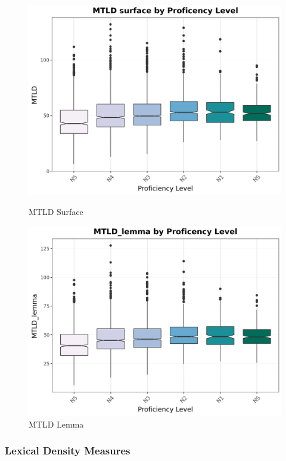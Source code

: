\begin{figure}[htbp]
    \centering
    \begin{minipage}{.48\textwidth}
        \centering
    \includegraphics[scale=.4]{img/MTLDsurface}
    \caption[MTLD Surface]{MTLD Surface}
        \label{fig:mtldS}
    \end{minipage}
    \hfill
\begin{minipage}{.48\textwidth}
        \centering
        \includegraphics[scale=.4]{img/MTLDlemma}
        \caption[MTLD lemma]{MTLD Lemma}
\label{fig:mtldL}
\end{minipage}
    \end{figure}

\subsubsection{Lexical Density Measures}

